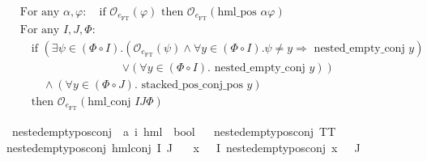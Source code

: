 \begin{isabellebody}
\begin{isamarkuptext}
\begin{align*}
& \text{For any } \alpha, \varphi: \quad \text{if } \mathcal{O}_{e_{\text{FT}}}(\varphi) \text{ then } \mathcal{O}_{e_{\text{FT}}}(\text{hml\_pos } \alpha \varphi) \\
& \text{For any } I, J, \Phi: \\
& \quad \text{if } \left( \exists \psi \in (\Phi \circ I). \left( \mathcal{O}_{e_{\text{FT}}}(\psi) \land \forall y \in (\Phi \circ I). \psi \neq y \Rightarrow \text{ nested\_empty\_conj } y \right) \right. \\
& \quad \quad \quad \quad \quad \quad \quad \quad \quad \left. \lor \left( \forall y \in (\Phi \circ I). \text{ nested\_empty\_conj } y \right) \right) \\
& \quad \quad \land \left( \forall y \in (\Phi \circ J). \text{ stacked\_pos\_conj\_pos } y \right) \\
& \quad \text{then } \mathcal{O}_{e_{\text{FT}}}(\text{hml\_conj } I J \Phi)
\end{align*}%
\end{isamarkuptext}\isamarkuptrue%
\isamarkupfalse%
\ nested{\isacharunderscore}{\kern0pt}empty{\isacharunderscore}{\kern0pt}pos{\isacharunderscore}{\kern0pt}conj\ {\isacharcolon}{\kern0pt}{\isacharcolon}{\kern0pt}\ {\isachardoublequoteopen}{\isacharparenleft}{\kern0pt}{\isacharprime}{\kern0pt}a{\isacharcomma}{\kern0pt}\ {\isacharprime}{\kern0pt}i{\isacharparenright}{\kern0pt}\ hml\ {\isasymRightarrow}\ bool{\isachardoublequoteclose}\isanewline
\ \ \isanewline
{\isachardoublequoteopen}nested{\isacharunderscore}{\kern0pt}empty{\isacharunderscore}{\kern0pt}pos{\isacharunderscore}{\kern0pt}conj\ TT{\isachardoublequoteclose}\ {\isacharbar}{\kern0pt}\isanewline
{\isachardoublequoteopen}nested{\isacharunderscore}{\kern0pt}empty{\isacharunderscore}{\kern0pt}pos{\isacharunderscore}{\kern0pt}conj\ {\isacharparenleft}{\kern0pt}hml{\isacharunderscore}{\kern0pt}conj\ I\ J\ {\isasymPhi}{\isacharparenright}{\kern0pt}{\isachardoublequoteclose}\ \isanewline
{}\ {\isachardoublequoteopen}{\isasymforall}x\ {\isasymin}\ {\isacharparenleft}{\kern0pt}{\isasymPhi}\ {\isacharbackquote}{\kern0pt}I{\isacharparenright}{\kern0pt}{\isachardot}{\kern0pt}\ nested{\isacharunderscore}{\kern0pt}empty{\isacharunderscore}{\kern0pt}pos{\isacharunderscore}{\kern0pt}conj\ x{\isachardoublequoteclose}\ {\isachardoublequoteopen}{\isacharparenleft}{\kern0pt}{\isasymPhi}\ {\isacharbackquote}{\kern0pt}\ J{\isacharparenright}{\kern0pt}\ {\isacharequal}{\kern0pt}\ {\isacharbraceleft}{\kern0pt}{\isacharbraceright}{\kern0pt}{\isachardoublequoteclose}\isanewline

\end{isabellebody}
